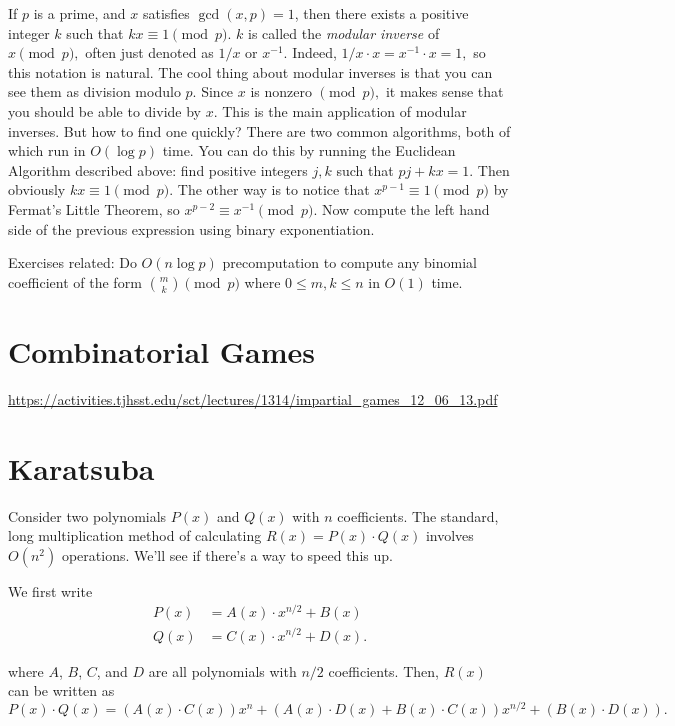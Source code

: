 If $p$ is a prime, and $x$ satisfies $\gcd(x, p) = 1$, then there exists a positive integer $k$ such that $kx \equiv 1 \pmod{p}.$ $k$ is called the \emph{modular inverse} of $x \pmod{p},$ often just denoted as $1/x$ or $x^{-1}.$ Indeed, $1/x \cdot x = x^{-1} \cdot x = 1,$ so this notation is natural. The cool thing about modular inverses is that you can see them as division modulo $p.$ Since $x$ is nonzero $\pmod{p},$ it makes sense that you should be able to divide by $x.$ This is the main application of modular inverses. But how to find one quickly? There are two common algorithms, both of which run in $O(\log p)$ time. You can do this by running the Euclidean Algorithm described above: find positive integers $j, k$ such that $pj + kx = 1.$ Then obviously $kx \equiv 1 \pmod{p}.$ The other way is to notice that $x^{p-1} \equiv 1 \pmod{p}$ by Fermat's Little Theorem, so $x^{p-2} \equiv x^{-1} \pmod{p}.$ Now compute the left hand side of the previous expression using binary exponentiation.

Exercises related: Do $O(n \log p)$ precomputation to compute any binomial coefficient of the form $\binom{m}{k} \pmod{p}$ where $0 \le m, k \le n$ in $O(1)$ time.

\section{Combinatorial Games}

\url{https://activities.tjhsst.edu/sct/lectures/1314/impartial_games_12_06_13.pdf}

\section{Karatsuba}

Consider two polynomials $P(x)$ and $Q(x)$ with $n$ coefficients. 
The standard, long multiplication method of calculating $R(x) = P(x) \cdot Q(x)$
involves $O(n^2)$ operations. We'll see if there's a way to speed this up.

We first write
\begin{align*}
P(x) &= A(x) \cdot x^{n/2} + B(x) \\
Q(x) &= C(x) \cdot x^{n/2} + D(x).
\end{align*}

where $A$, $B$, $C$, and $D$ are all polynomials with $n/2$ coefficients.
Then, $R(x)$ can be written as
\[P(x) \cdot Q(x) = (A(x) \cdot C(x)) x^n + (A(x) \cdot D(x) + B(x) \cdot C(x)) x^{n/2} + (B(x) \cdot D(x)).\]

